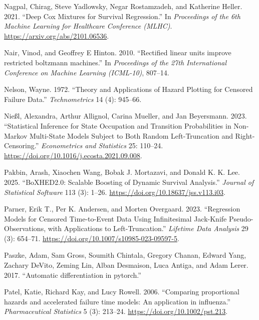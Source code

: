 \documentclass[
  letterpaper,
  krantz2]{style/krantz}
\newlength{\cslhangindent}
\newenvironment{CSLReferences}[2] %
 {\begin{list}{}{%
  \setlength{\itemindent}{0pt}
  \setlength{\leftmargin}{0pt}
  \setlength{\parsep}{0pt}
  \ifodd #1
   \setlength{\leftmargin}{\cslhangindent}
   \setlength{\itemindent}{-1\cslhangindent}
  \fi
  \setlength{\itemsep}{#2\baselineskip}}}
 {\end{list}}
\begin{document}
\begin{CSLReferences}{1}{0}
Nagpal, Chirag, Steve Yadlowsky, Negar Rostamzadeh, and Katherine
Heller. 2021. {``{Deep Cox Mixtures for Survival Regression}.''} In
\emph{Proceedings of the 6th Machine Learning for Healthcare Conference
(MLHC)}. \url{https://arxiv.org/abs/2101.06536}.

Nair, Vinod, and Geoffrey E Hinton. 2010. {``{Rectified linear units
improve restricted boltzmann machines}.''} In \emph{Proceedings of the
27th International Conference on Machine Learning (ICML-10)}, 807--14.

Nelson, Wayne. 1972. {``{Theory and Applications of Hazard Plotting for
Censored Failure Data}.''} \emph{Technometrics} 14 (4): 945--66.

Nießl, Alexandra, Arthur Allignol, Carina Mueller, and Jan Beyersmann.
2023. {``Statistical Inference for State Occupation and Transition
Probabilities in Non-{Markov} Multi-State Models Subject to Both Random
Left-Truncation and Right-Censoring.''} \emph{Econometrics and
Statistics} 25: 110--24.
\url{https://doi.org/10.1016/j.ecosta.2021.09.008}.

Pakbin, Arash, Xiaochen Wang, Bobak J. Mortazavi, and Donald K. K. Lee.
2025. {``BoXHED2.0: Scalable Boosting of Dynamic Survival Analysis.''}
\emph{Journal of Statistical Software} 113 (3): 1--26.
\url{https://doi.org/10.18637/jss.v113.i03}.

Parner, Erik T., Per K. Andersen, and Morten Overgaard. 2023.
{``Regression Models for Censored Time-to-Event Data Using Infinitesimal
Jack-Knife Pseudo-Observations, with Applications to Left-Truncation.''}
\emph{Lifetime Data Analysis} 29 (3): 654--71.
\url{https://doi.org/10.1007/s10985-023-09597-5}.

Paszke, Adam, Sam Gross, Soumith Chintala, Gregory Chanan, Edward Yang,
Zachary DeVito, Zeming Lin, Alban Desmaison, Luca Antiga, and Adam
Lerer. 2017. {``{Automatic differentiation in pytorch}.''}

Patel, Katie, Richard Kay, and Lucy Rowell. 2006. {``{Comparing
proportional hazards and accelerated failure time models: An application
in influenza}.''} \emph{Pharmaceutical Statistics} 5 (3): 213--24.
\url{https://doi.org/10.1002/pst.213}.


\end{CSLReferences}
\end{document}
